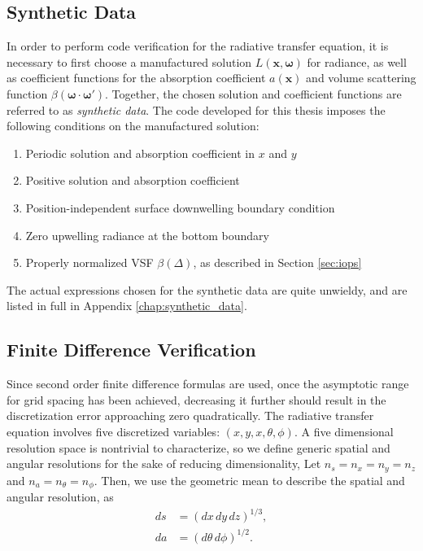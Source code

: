 \documentclass[ms,cpyr,lof,lot]{uathesis}
\renewcommand\vec\bm
\begin{document}
\subsection{Synthetic Data}
\label{sec:synthetic_data}
In order to perform code verification for the radiative transfer equation, it is necessary to first choose a manufactured solution $L(\vec{x}, \vec{\omega})$ for radiance, as well as coefficient functions for the absorption coefficient $a(\vec{x})$ and volume scattering function $\beta(\vec{\omega}\cdot\vec{\omega'})$.
Together, the chosen solution and coefficient functions are referred to as \textit{synthetic data}.
The code developed for this thesis imposes the following conditions on the manufactured solution:
\begin{enumerate}
  \item Periodic solution and absorption coefficient in $x$ and $y$
  \item Positive solution and absorption coefficient
  \item Position-independent surface downwelling boundary condition
  \item Zero upwelling radiance at the bottom boundary
  \item Properly normalized VSF $\beta(\Delta)$, as described in Section \ref{sec:iops}
\end{enumerate}
The actual expressions chosen for the synthetic data are quite unwieldy, and are listed in full in Appendix \ref{chap:synthetic_data}.


\subsection{Finite Difference Verification}
Since second order finite difference formulas are used, once the asymptotic range for grid spacing has been achieved, decreasing it further should result in the discretization error approaching zero quadratically.
The radiative transfer equation involves five discretized variables: $(x,y,x,\theta,\phi)$.
A five dimensional resolution space is nontrivial to characterize, so we define generic spatial and angular resolutions for the sake of reducing dimensionality,
Let $n_s = n_x = n_y = n_z$ and $n_a = n_\theta = n_\phi$.
Then, we use the geometric mean to describe the spatial and angular resolution, as
\begin{align}
  ds &= (dx\, dy\, dz)^{1/3}, \\
  da &= (d\theta\, d\phi)^{1/2}.
\end{align}
\end{document}
